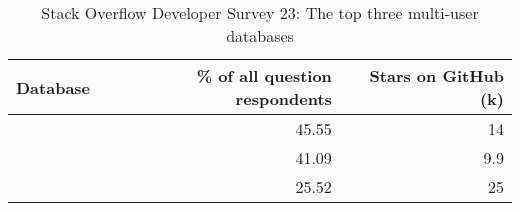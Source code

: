 \begin{table}[ht]
\centering
\caption{Stack Overflow Developer Survey 23: The top three multi-user databases \parencite{stackOverflowPollDatabases23}}
\label{tab:stackOverflowDatabasesRanking}
\begin{tabular}[t]{|l|r|r|}
\toprule
Database & \% of all question respondents & Stars on GitHub (k)\\
\midrule
\cite{githubPostgreSql} & 45.55 & 14\\
\cite{githubMySql} & 41.09 & 9.9\\
\cite{githubMongoDb} & 25.52 & 25\\
\bottomrule
\end{tabular}
\end{table}